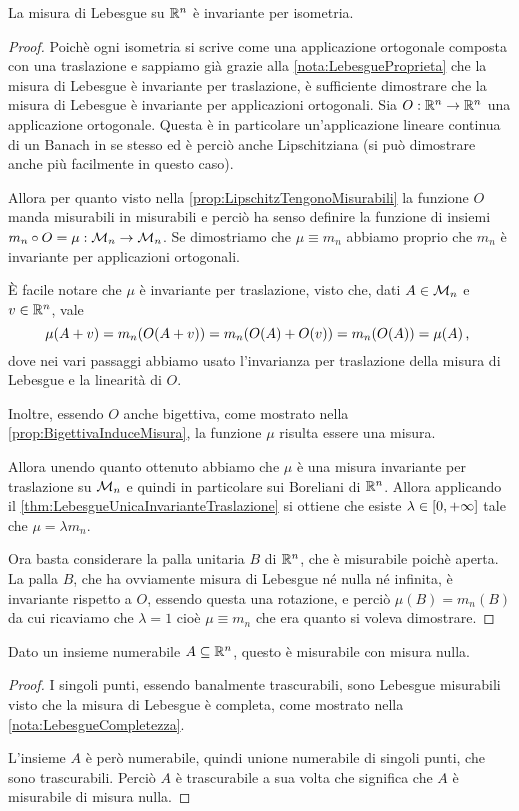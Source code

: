 \begin{proposition}\label{prop:LebesgueProprietaIsometria}
	La misura di Lebesgue su $\mathbb R^n$ è invariante per isometria.
\end{proposition}
\begin{proof}
	Poichè ogni isometria si scrive come una applicazione ortogonale composta con una traslazione e sappiamo già grazie alla \cref{nota:LebesgueProprieta} che la misura di Lebesgue è invariante per traslazione, è sufficiente dimostrare che la misura di Lebesgue è invariante per applicazioni ortogonali.
	Sia $O:\mathbb R^n\to\mathbb R^n$ una applicazione ortogonale. Questa è in particolare un'applicazione lineare continua di un Banach in se stesso ed è perciò anche Lipschitziana (si può dimostrare anche più facilmente in questo caso).
	
	Allora per quanto visto nella \cref{prop:LipschitzTengonoMisurabili} la funzione $O$ manda misurabili in misurabili e perciò ha senso definire la funzione di insiemi $m_n \circ O=\mu:\mathcal M_n\to\mathcal M_n$. 
	Se dimostriamo che $\mu\equiv m_n$ abbiamo proprio che $m_n$ è invariante per applicazioni ortogonali.
	
	È facile notare che $\mu$ è invariante per traslazione, visto che, dati $A\in \mathcal M_n$ e $v\in\mathbb R^n$, vale
	\begin{equation*}
		\mu(A+v)=m_n(O(A+v))=m_n(O(A)+O(v))=m_n(O(A))=\mu(A) \, \text{, }
	\end{equation*}
	dove nei vari passaggi abbiamo usato l'invarianza per traslazione della misura di Lebesgue e la linearità di $O$.
	
	Inoltre, essendo $O$ anche bigettiva, come mostrato nella \cref{prop:BigettivaInduceMisura}, la funzione $\mu$ risulta essere una misura.
	
	Allora unendo quanto ottenuto abbiamo che $\mu$ è una misura invariante per traslazione su $\mathcal M_n$ e quindi in particolare sui Boreliani di $\mathbb R^n$. Allora applicando il \cref{thm:LebesgueUnicaInvarianteTraslazione} si ottiene che esiste $\lambda\in[0,+\infty]$ tale che $\mu=\lambda m_n$.
	
	Ora basta considerare la palla unitaria $B$ di $\mathbb R^n$, che è misurabile poichè aperta.
	La palla $B$, che ha ovviamente misura di Lebesgue né nulla né infinita, è invariante rispetto a $O$, essendo questa una rotazione, e perciò $\mu(B)=m_n(B)$ da cui ricaviamo che $\lambda=1$ cioè $\mu\equiv m_n$ che era quanto si voleva dimostrare.
\end{proof}

\begin{proposition}\label{prop:NumerabiliLebesgueTrascurabili}
	Dato un insieme numerabile $A\subseteq\mathbb R^n$, questo è misurabile con misura nulla.
\end{proposition}
\begin{proof}
	I singoli punti, essendo banalmente trascurabili, sono Lebesgue misurabili visto che la misura di Lebesgue è completa, come mostrato nella \cref{nota:LebesgueCompletezza}.
	
	L'insieme $A$ è però numerabile, quindi unione numerabile di singoli punti, che sono trascurabili. Perciò $A$ è trascurabile a sua volta che significa che $A$ è misurabile di misura nulla.
\end{proof}

